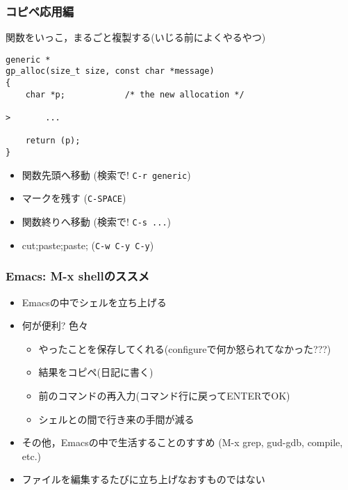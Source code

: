 \documentclass[12pt,dvipdfmx]{beamer}
\newcommand{\ao}[1]{{\color{blue}#1}}
\begin{document}
\begin{frame}[fragile]
\frametitle{コピペ応用編}
関数をいっこ，まるごと複製する(いじる前によくやるやつ)
\begin{lstlisting}
generic *
gp_alloc(size_t size, const char *message)
{
    char *p;			/* the new allocation */

>       ...

    return (p);
}
\end{lstlisting}

\begin{itemize}
\item 関数先頭へ移動 (検索で! \texttt{\ao{C-r generic}})
\item マークを残す (\texttt{\ao{C-SPACE}})
\item 関数終りへ移動 (検索で! \texttt{\ao{C-s ...}})
\item cut;paste;paste; (\texttt{\ao{C-w C-y C-y}})
\end{itemize}
\end{frame}




\begin{frame}
\frametitle{Emacs: M-x shellのススメ}
\begin{itemize}
\item Emacsの中でシェルを立ち上げる
\item 何が便利? 色々
  \begin{itemize}
  \item やったことを保存してくれる(configureで何か怒られてなかった???)
  \item 結果をコピペ(日記に書く)
  \item 前のコマンドの再入力(コマンド行に戻ってENTERでOK)
  \item シェルとの間で行き来の手間が減る
  \end{itemize}
\item その他，Emacsの中で生活することのすすめ
  (M-x grep, gud-gdb, compile, etc.)
\item ファイルを編集するたびに立ち上げなおすものではない
\end{itemize}
\end{frame}
\end{document}
